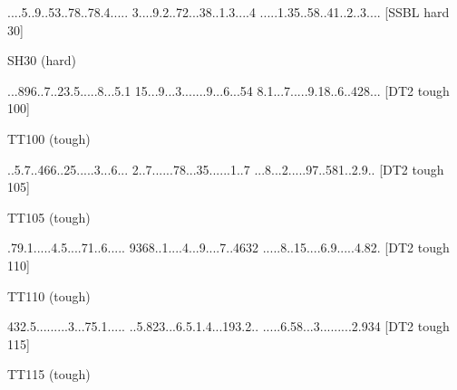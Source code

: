 \documentclass[twoside]{article}
\begin{document}
\renewcommand*{\puzzlefile}{sh30.sud}
\writepuzzle%
{....5..9.}{.53..78..}{78.4.....}%
{3....9.2.}{.72...38.}{.1.3....4}%
{.....1.35}{..58..41.}{.2..3....}%
[SSBL hard 30]
\vfill
\begin{minipage}{0.95\linewidth}\begin{center}
SH30 (hard) \\
\end{center}\end{minipage}

\renewcommand*{\puzzlefile}{tt100.sud}
\writepuzzle%
{...896..7}{..23.5...}{..8...5.1}%
{15...9...}{3.......9}{...6...54}%
{8.1...7..}{...9.18..}{6..428...}%
[DT2 tough 100]
\vfill
\begin{minipage}{0.95\linewidth}\begin{center}
TT100 (tough) \\
\end{center}\end{minipage}

\renewcommand*{\puzzlefile}{tt105.sud}
\writepuzzle%
{..5.7..46}{6..25....}{.3...6...}%
{2..7.....}{.78...35.}{.....1..7}%
{...8...2.}{....97..5}{81..2.9..}%
[DT2 tough 105]
\vfill
\begin{minipage}{0.95\linewidth}\begin{center}
TT105 (tough) \\
\end{center}\end{minipage}

\renewcommand*{\puzzlefile}{tt110.sud}
\writepuzzle%
{.79.1....}{.4.5....7}{1..6.....}%
{9368..1..}{..4...9..}{..7..4632}%
{.....8..1}{5....6.9.}{....4.82.}%
[DT2 tough 110]
\vfill
\begin{minipage}{0.95\linewidth}\begin{center}
TT110 (tough) \\
\end{center}\end{minipage}

\renewcommand*{\puzzlefile}{tt115.sud}
\writepuzzle%
{432.5....}{.....3...}{75.1.....}%
{..5.823..}{.6.5.1.4.}{..193.2..}%
{.....6.58}{...3.....}{....2.934}%
[DT2 tough 115]
\vfill
\begin{minipage}{0.95\linewidth}\begin{center}
TT115 (tough) \\
\end{center}\end{minipage}
\end{document}
